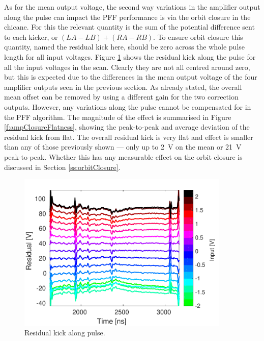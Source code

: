 As for the mean output voltage, the second way variations in the amplifier output along the pulse can impact the PFF performance is via the orbit closure in the chicane. For this the relevant quantity is the sum of the potential difference sent to each kicker, or \((LA-LB)+(RA-RB)\). To ensure orbit closure this quantity, named the residual kick here, should be zero across the whole pulse length for all input voltages. Figure \ref{f:ampClosure} shows the residual kick along the pulse for all the input voltages in the scan. Clearly they are not all centred around zero, but this is expected due to the differences in the mean output voltage of the four amplifier outputs seen in the previous section. As already stated, the overall mean offset can be removed by using a different gain for the two correction outputs. However, any variations along the pulse cannot be compensated for in the PFF algorithm. The magnitude of the effect is summarised in Figure \ref{f:ampClosureFlatness}, showing the peak-to-peak and average deviation of the residual kick from flat. The overall residual kick is very flat and effect is smaller than any of those previously shown --- only up to 2~V on the mean or 21~V peak-to-peak. Whether this has any measurable effect on the orbit closure is discussed in Section \ref{ss:orbitClosure}.

\begin{figure}
  \centering
  \includegraphics[width=0.9\textwidth]{Figures/commissioning/residualKick_Traces}
  \caption{Residual kick along pulse.}
  \label{f:ampClosure}
\end{figure}

